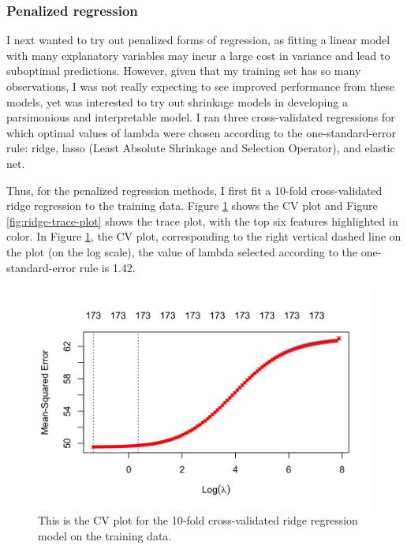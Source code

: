 \documentclass[
]{article}
\begin{document}
\hypertarget{penalized-regression}{%
\subsubsection{Penalized regression}\label{penalized-regression}}

I next wanted to try out penalized forms of regression, as fitting a linear model with many explanatory variables may incur a large cost in variance and lead to suboptimal predictions. However, given that my training set has so many observations, I was not really expecting to see improved performance from these models, yet was interested to try out shrinkage models in developing a parsimonious and interpretable model. I ran three cross-validated regressions for which optimal values of lambda were chosen according to the one-standard-error rule: ridge, lasso (Least Absolute Shrinkage and Selection Operator), and elastic net.

Thus, for the penalized regression methods, I first fit a 10-fold cross-validated ridge regression to the training data. Figure \ref{fig:ridge-cv-plot} shows the CV plot and Figure \ref{fig:ridge-trace-plot} shows the trace plot, with the top six features highlighted in color. In Figure \ref{fig:ridge-cv-plot}, the CV plot, corresponding to the right vertical dashed line on the plot (on the log scale), the value of lambda selected according to the one-standard-error rule is 1.42.

\begin{figure}[H]

{\centering \includegraphics[width=0.8\linewidth]{../results/ridge-cv-plot} 

}

\caption{This is the CV plot for the 10-fold cross-validated ridge regression model on the training data.}\label{fig:ridge-cv-plot}
\end{figure}
\end{document}
